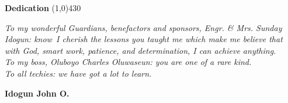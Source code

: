 \clearpage
\begin{center}
{\huge \bf Dedication}
\line(1,0){430}
\end{center}

\textit{To my wonderful Guardians, benefactors and sponsors, Engr. \& Mrs. Sunday Idogun: know I cherish the lessons you taught me which make me believe that with God, smart work, patience, and determination, I can achieve anything.}\\

\textit{To my boss, Oluboyo Charles Oluwaseun: you are one of a rare kind.}\\


\textit{To all techies: we have got a lot to learn.}
\begin{flushright}
	{\bf Idogun John O.}
\end{flushright}
  
\clearpage